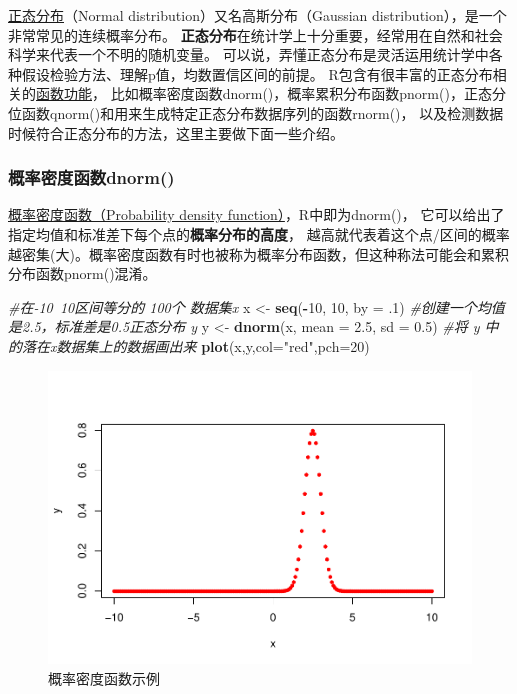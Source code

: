 \documentclass[
]{article}
\newenvironment{Shaded}{\begin{snugshade}}{\end{snugshade}}
\newcommand{\CommentTok}[1]{\textcolor[rgb]{0.56,0.35,0.01}{\textit{#1}}}
\newcommand{\DataTypeTok}[1]{\textcolor[rgb]{0.13,0.29,0.53}{#1}}
\newcommand{\DecValTok}[1]{\textcolor[rgb]{0.00,0.00,0.81}{#1}}
\newcommand{\FloatTok}[1]{\textcolor[rgb]{0.00,0.00,0.81}{#1}}
\newcommand{\KeywordTok}[1]{\textcolor[rgb]{0.13,0.29,0.53}{\textbf{#1}}}
\newcommand{\NormalTok}[1]{#1}
\newcommand{\OperatorTok}[1]{\textcolor[rgb]{0.81,0.36,0.00}{\textbf{#1}}}
\newcommand{\StringTok}[1]{\textcolor[rgb]{0.31,0.60,0.02}{#1}}
\begin{document}
\href{https://zh.wikipedia.org/zh-cn/\%E6\%AD\%A3\%E6\%80\%81\%E5\%88\%86\%E5\%B8\%83}{正态分布}（Normal distribution）又名高斯分布（Gaussian distribution），是一个非常常见的连续概率分布。
\textbf{正态分布}在统计学上十分重要，经常用在自然和社会科学来代表一个不明的随机变量。
可以说，弄懂正态分布是灵活运用统计学中各种假设检验方法、理解p值，均数置信区间的前提。
R包含有很丰富的正态分布相关的\href{https://stat.ethz.ch/R-manual/R-devel/library/stats/html/Normal.html}{函数功能}，
比如概率密度函数dnorm()，概率累积分布函数pnorm()，正态分位函数qnorm()和用来生成特定正态分布数据序列的函数rnorm()，
以及检测数据时候符合正态分布的方法，这里主要做下面一些介绍。

\hypertarget{ux6982ux7387ux5bc6ux5ea6ux51fdux6570dnorm}{%
\subsubsection{概率密度函数dnorm()}\label{ux6982ux7387ux5bc6ux5ea6ux51fdux6570dnorm}}

\href{https://zh.wikipedia.org/zh-cn/\%E6\%A9\%9F\%E7\%8E\%87\%E5\%AF\%86\%E5\%BA\%A6\%E5\%87\%BD\%E6\%95\%B8}{概率密度函数（Probability density function）}，R中即为dnorm()，
它可以给出了指定均值和标准差下每个点的\textbf{概率分布的高度}，
越高就代表着这个点/区间的概率越密集(大)。概率密度函数有时也被称为概率分布函数，但这种称法可能会和累积分布函数pnorm()混淆。

\begin{Shaded}
\begin{Highlighting}[]
\CommentTok{#在-10~10区间等分的 100个 数据集x}
\NormalTok{x <-}\StringTok{ }\KeywordTok{seq}\NormalTok{(}\OperatorTok{-}\DecValTok{10}\NormalTok{, }\DecValTok{10}\NormalTok{, }\DataTypeTok{by =} \FloatTok{.1}\NormalTok{)}
\CommentTok{#创建一个均值是2.5，标准差是0.5正态分布 y}
\NormalTok{y <-}\StringTok{ }\KeywordTok{dnorm}\NormalTok{(x, }\DataTypeTok{mean =} \FloatTok{2.5}\NormalTok{, }\DataTypeTok{sd =} \FloatTok{0.5}\NormalTok{)}
\CommentTok{#将 y 中的落在x数据集上的数据画出来}
\KeywordTok{plot}\NormalTok{(x,y,}\DataTypeTok{col=}\StringTok{"red"}\NormalTok{,}\DataTypeTok{pch=}\DecValTok{20}\NormalTok{)}
\end{Highlighting}
\end{Shaded}

\begin{figure}

{\centering \includegraphics[width=0.49\linewidth,height=0.49\textheight]{figs/dnorm} 

}

\caption{概率密度函数示例}\label{fig:dnorm}
\end{figure}
\end{document}
